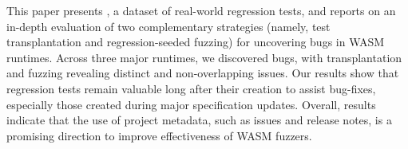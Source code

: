 \documentclass[lettersize,journal]{IEEEtran}
\begin{document}
This paper presents \tname{}, a dataset of real-world \wasm{} regression tests, and reports on an in-depth evaluation of two complementary strategies (namely, test transplantation and regression-seeded fuzzing) for uncovering bugs in WASM runtimes. Across three major runtimes, we discovered \TotalBugs{} bugs, with transplantation and fuzzing revealing distinct and non-overlapping issues. Our results show that regression tests remain valuable long after their creation to assist bug-fixes, especially those created during major specification updates.
%
Overall, results indicate that the use of project metadata, such as issues and release notes, is a promising direction to improve effectiveness of WASM fuzzers.

\balance



\end{document}
